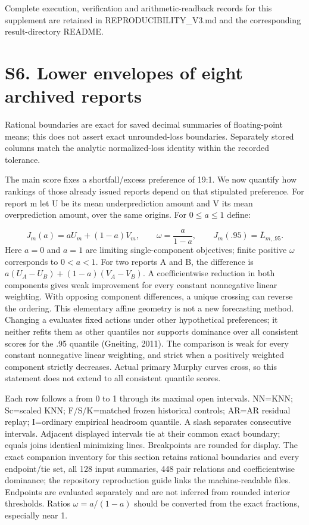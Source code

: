 \documentclass[11pt,a4paper]{article}
\begin{document}
Complete execution, verification and arithmetic-readback records for this supplement are retained in REPRODUCIBILITY\_V3.md and the corresponding result-directory README.

\section*{S6. Lower envelopes of eight archived reports}
Rational boundaries are exact for saved decimal summaries of floating-point means; this does not assert exact unrounded-loss boundaries. Separately stored columns match the analytic normalized-loss identity within the recorded tolerance.

The main score fixes a shortfall/excess preference of 19:1. We now quantify how rankings of those already issued reports depend on that stipulated preference. For report m let U be its mean underprediction amount and V its mean overprediction amount, over the same origins. For \(0\le a\le1\) define:

\[
J_m(a)=aU_m+(1-a)V_m,\qquad \omega=\frac{a}{1-a},\qquad J_m(.95)=\overline L_{m,.95}.
\]
Here \(a=0\) and \(a=1\) are limiting single-component objectives; finite positive \(\omega\) corresponds to \(0<a<1\). For two reports A and B, the difference is \(a(U_A-U_B)+(1-a)(V_A-V_B)\). A coefficientwise reduction in both components gives weak improvement for every constant nonnegative linear weighting. With opposing component differences, a unique crossing can reverse the ordering. This elementary affine geometry is not a new forecasting method. Changing a evaluates fixed actions under other hypothetical preferences; it neither refits them as other quantiles nor supports dominance over all consistent scores for the .95 quantile (Gneiting, 2011). The comparison is weak for every constant nonnegative linear weighting, and strict when a positively weighted component strictly decreases. Actual primary Murphy curves cross, so this statement does not extend to all consistent quantile scores.

Each row follows a from 0 to 1 through its maximal open intervals. NN=KNN; Sc=scaled KNN; F/S/K=matched frozen historical controls; AR=AR residual replay; I=ordinary empirical headroom quantile. A slash separates consecutive intervals. Adjacent displayed intervals tie at their common exact boundary; equals joins identical minimizing lines. Breakpoints are rounded for display. The exact companion inventory for this section retains rational boundaries and every endpoint/tie set, all 128 input summaries, 448 pair relations and coefficientwise dominance; the repository reproduction guide links the machine-readable files. Endpoints are evaluated separately and are not inferred from rounded interior thresholds. Ratios \(\omega=a/(1-a)\) should be converted from the exact fractions, especially near 1.
\end{document}
